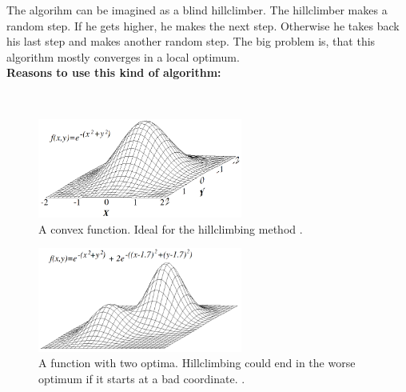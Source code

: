 \documentclass[10pt,a4paper,DIV=11]{scrreprt}
\begin{document}
The algorihm can be imagined as a blind hillclimber. The hillclimber makes a random step. If he gets higher, he makes the next step. Otherwise he takes back his last step and makes another random step. The big problem is, that this algorithm mostly converges in a local optimum. \\

\textbf{Reasons to use this kind of algorithm:}

   \\



\begin{center}
	\begin{figure}[H]
		\centering
		\includegraphics[width=0.6\textwidth,scale=1]{files/Hill_climb.png}  
		\caption{A convex function. Ideal for the hillclimbing method \cite{wiki-hill}.}
		\label{fig:hill}
	\end{figure}
\end{center}

\begin{center}
	\begin{figure}[H]
		\centering
		\includegraphics[width=0.6\textwidth,scale=1]{files/Local_maximum.png}  
		\caption{A function with two optima. Hillclimbing could end in the worse optimum if it starts at a bad coordinate. \cite{wiki-hill}.}
		\label{fig:hill2}
	\end{figure}
\end{center}
\end{document}
